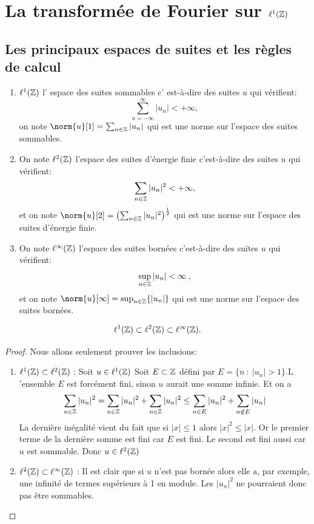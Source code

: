 \section{La transform\'ee de Fourier sur $\ell^1(\mathbb{Z})$}
\subsection{Les principaux espaces de suites et les r\`{e}gles de calcul}
\begin{definition}
\begin{enumerate}[label=(\roman*)]
\item  $\ell^1(\mathbb{Z})$ l' espace des suites sommables  c' est-\`{a}-dire des suites $u$ qui v\'{e}rifient:
$$
\sum_{n=-\infty}^\infty |u_{n}|<+\infty,
$$
on note $\norm{u}[1] =\sum_{n\in \zset}|u_{n}|$ qui est une norme sur l'espace des suites sommables.
\item On note $\ell^2(\mathbb{Z})$ l'espace des suites d'\'{e}nergie finie c'est-\`{a}-dire des suites $u$ qui v\'{e}rifient:
$$
\sum_{n\in \mathbb{Z}}|u_{n}|^{2}<+\infty,
$$
et on note $\norm{u}[2]=\left(\sum_{n\in \zset}|u_{n}|^{2}\right)^{\frac{1}{2}}$
qui est une norme sur l'espace des suites d'\'{e}nergie finie.
\item On note $\ell^\infty(\mathbb{Z})$ l'espace des suites born\'{e}es c'est-\`{a}-dire des suites $u$ qui v\'{e}rifient:
$$
\sup_{n \in \mathbb{Z}} |u_{n}| < \infty \;,
$$
et on note $\norm{u}[\infty]=\sup_{n\in \zset}\{|u_{n}|\}$ qui est une norme sur l'espace des suites born\'{e}es.
\end{enumerate}
\end{definition}
\begin{lemma}
$$
\ell^1(\mathbb{Z}) \subset \ell^2(\mathbb{Z}) \subset \ell^\infty(\mathbb{Z}) .
$$
\end{lemma}
\begin{proof}
Nous allons seulement prouver les inclusions:
\begin{enumerate}
\item $\ell^1(\mathbb{Z}) \subset \ell^2(\mathbb{Z})$ : Soit $u\in \ell^1(\mathbb{Z})$ Soit $E\subset \mathbb{Z}$ d\'{e}fini par $E=\{n\ :\ |u_{n}|>1\}. \mathrm{L}$'ensemble $E$ est forc\'{e}ment fini, sinon $u$ aurait une somme infinie. Et on a
$$
\sum_{n \in \mathbb{Z}} |u_{n}|^{2}=\sum_{n \in \mathbb{Z}} |u_{n}|^{2}+\sum_{n \in \mathbb{Z}} |u_{n}|^{2}\leq\sum_{n \in E} |u_{n}|^{2}+\sum_{n \not \in E}|u_{n}|
$$
La derni\`{e}re in\'{e}galit\'{e} vient du fait que si $|x|\leq 1$ alors $|x|^{2}\leq|x|$. Or le premier terme de la derni\`{e}re somme est fini car $E$ est fini. Le second est fini aussi car $u$ est sommable. Donc $u\in \ell^2(\mathbb{Z})$
\item $\ell^2(\mathbb{Z})\subset \ell^\infty(\mathbb{Z})$ : Il est clair que si $u$ n'est pas born\'{e}e alors elle $\mathrm{a}$, par exemple, une infinit\'{e} de termes sup\'{e}rieurs \`{a} 1 en module. Les $|u_{n}|^{2}$ ne pourraient donc pas \^{e}tre sommables.
\end{enumerate}
\end{proof}
